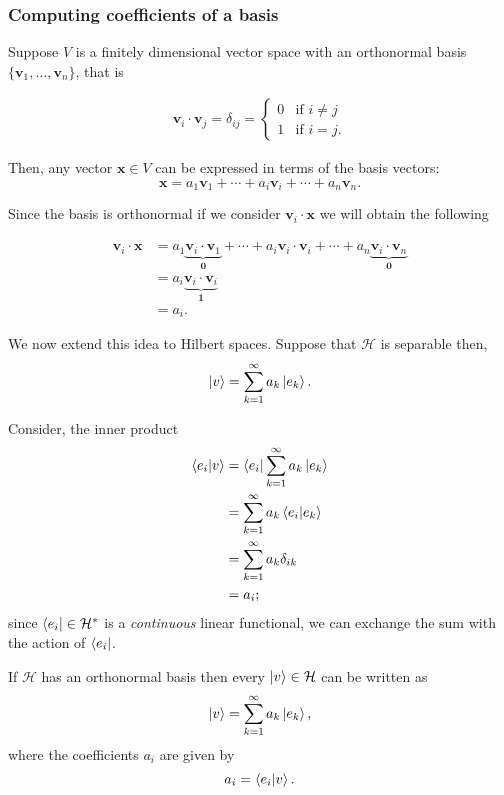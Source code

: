 \documentclass[12pt, a4paper]{article}
\begin{document}
\subsubsection{Computing coefficients of a basis}

Suppose \(V\) is a finitely dimensional vector space with an orthonormal basis \\ \(\{\bm{v}_1, \ldots, \bm{v}_n\}\), that is 

\[\begin{aligned}
    \bm{v}_i \cdot \bm{v}_j = \delta_{ij} = \begin{cases}
        0 &\text{if } i\neq j \\
        1 &\text{if } i=j.
    \end{cases}
\end{aligned}\]

Then, any vector \(\bm{x} \in V\) can be expressed in terms of the basis vectors:
\[\bm{x} = a_1 \bm{v}_1 + \cdots + a_i \bm{v}_i + \cdots + a_n \bm{v}_n.\]

Since the basis is orthonormal if we consider \(\bm{v}_i \cdot \bm{x}\) we will obtain the following 

\[\begin{aligned}
    \bm{v}_i \cdot \bm{x} &= a_1 \underbrace{\bm{v}_i \cdot \bm{v}_1}_{\bm{0}} + \cdots + a_i \bm{v}_i \cdot \bm{v}_i + \cdots + a_n  \underbrace{\bm{v}_i \cdot \bm{v}_n}_{\bm{0}}\\
    &= a_i \underbrace{\bm{v}_i \cdot \bm{v}_i}_{\bm{1}} \\
    &= a_i.
\end{aligned}\]

We now extend this idea to Hilbert spaces. Suppose that \(\mathcal{H}\) is separable then,
\[\ket{v} = \sum_{k=1}^{\infty} a_k \ket{e_k}.\]

Consider, the inner product 
\[\begin{aligned}
    \bra{e_i}\ket{v} &= \bra{e_i} \sum_{k=1}^{\infty} a_k \ket{e_k} \\
    &= \sum_{k=1}^{\infty} a_k \bra{e_i} \ket{e_k} \\
    &= \sum_{k=1}^{\infty} a_k \delta_{ik} \\
    &= a_i;
\end{aligned}\]
since \(\bra{e_i} \in \mathcal{H}^*\) is a \textit{continuous} linear functional, we can exchange the sum with the action of \(\bra{e_i}\).

\begin{mdthm}
    If \(\mathcal{H}\) has an orthonormal basis then every \(\ket{v} \in \mathcal{H}\) can be written as 
    \[\ket{v} = \sum_{k=1}^{\infty} a_k \ket{e_k},\]
    where the coefficients \(a_i\) are given by 
    \[a_i = \bra{e_i} \ket{v}.\]
\end{mdthm}
\end{document}
